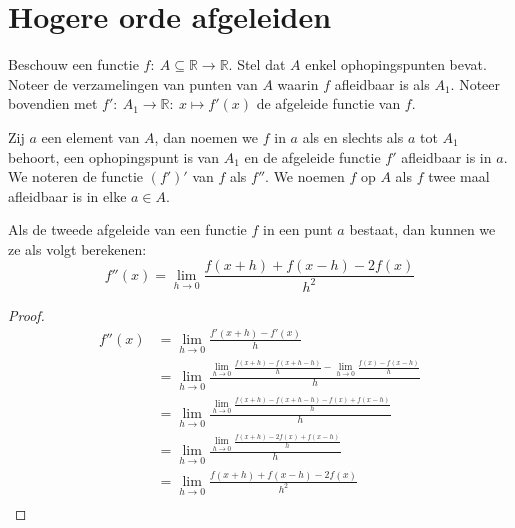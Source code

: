 \documentclass[main.tex]{subfiles}
\begin{document}
\section{Hogere orde afgeleiden}
\label{sec:hogere-orde-afgel}

\begin{de}
  Beschouw een functie $f:\ A \subseteq \mathbb{R} \rightarrow \mathbb{R}$.
  Stel dat $A$ enkel ophopingspunten bevat.
  Noteer de verzamelingen van punten van $A$ waarin $f$ afleidbaar is als $A_{1}$.
  Noteer bovendien met $f':\ A_{1} \rightarrow \mathbb{R}:\ x \mapsto f'(x)$ de afgeleide functie van $f$.

  Zij $a$ een element van $A$, dan noemen we $f$  in $a$ als en slechts als $a$ tot $A_{1}$ behoort, een ophopingspunt is van $A_{1}$ en de afgeleide functie $f'$ afleidbaar is in $a$.
  We noteren de  functie $(f')'$ van $f$ als $f''$.
  We noemen $f$  op $A$ als $f$ twee maal afleidbaar is in elke $a\in A$.
\end{de}

\begin{st}
  \label{st:berekening-tweede-afgeleide}
  Als de tweede afgeleide van een functie $f$ in een punt $a$ bestaat, dan kunnen we ze als volgt berekenen:
  \[ f''(x) = \lim_{h \rightarrow 0}\frac{f(x+h)+f(x-h)-2f(x)}{h^{2}} \]

  \begin{proof}
    \[ 
    \begin{array}{rl}
      f''(x)
      &= \lim_{h \rightarrow 0}\frac{f'(x+h)-f'(x)}{h}\\
      &= \lim_{h \rightarrow 0}\frac{\lim_{h \rightarrow 0}\frac{f(x+h)-f(x+h-h)}{h}-\lim_{h \rightarrow 0}\frac{f(x)-f(x-h)}{h}}{h}\\
      &= \lim_{h \rightarrow 0}\frac{\lim_{h \rightarrow 0}\frac{f(x+h)-f(x+h-h)-f(x)+f(x-h)}{h}}{h}\\
      &= \lim_{h \rightarrow 0}\frac{\lim_{h \rightarrow 0}\frac{f(x+h)-2f(x)+f(x-h)}{h}}{h}\\
      &= \lim_{h \rightarrow 0}\frac{f(x+h)+f(x-h)-2f(x)}{h^{2}} \\
    \end{array}
    \]
  \end{proof}
\end{st}
\end{document}
